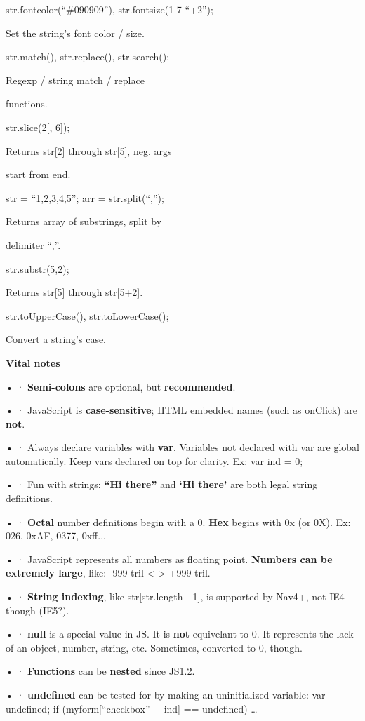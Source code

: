 \documentclass[
]{article}
\begin{document}
str.fontcolor(``\#090909''), str.fontsize(1-7 \textbar{} ``+2'');

Set the string's font color / size.

str.match(), str.replace(), str.search();

Regexp / string match / replace

functions.

str.slice(2{[}, 6{]});

Returns str{[}2{]} through str{[}5{]}, neg. args

start from end.

str = ``1,2,3,4,5''; arr = str.split(``,'');

Returns array of substrings, split by

delimiter ``,''.

str.substr(5,2);

Returns str{[}5{]} through str{[}5+2{]}.

str.toUpperCase(), str.toLowerCase();

Convert a string's case.

\textbf{Vital notes}

• · \textbf{Semi-colons} are optional, but \textbf{recommended}.

• · JavaScript is \textbf{case-sensitive}; HTML embedded names (such as
onClick) are \textbf{not}.

• · Always declare variables with \textbf{var}. Variables not declared
with var are global automatically. Keep vars declared on top for
clarity. Ex: var ind = 0;

• · Fun with strings: \textbf{``Hi there''} and \textbf{`Hi there'} are
both legal string definitions.

• · \textbf{Octal} number definitions begin with a 0. \textbf{Hex}
begins with 0x (or 0X). Ex: 026, 0xAF, 0377, 0xff...

• · JavaScript represents all numbers as floating point. \textbf{Numbers
can be extremely large}, like: -999 tril \textless-\textgreater{} +999
tril.

• · \textbf{String indexing}, like str{[}str.length - 1{]}, is supported
by Nav4+, not IE4 though (IE5?).

• · \textbf{null} is a special value in JS. It is \textbf{not}
equivelant to 0. It represents the lack of an object, number, string,
etc. Sometimes, converted to 0, though.

• · \textbf{Functions} can be \textbf{nested} since JS1.2.

• · \textbf{undefined} can be tested for by making an uninitialized
variable: var undefined; if (myform{[}``checkbox'' + ind{]} ==
undefined) \ldots{}
\end{document}
